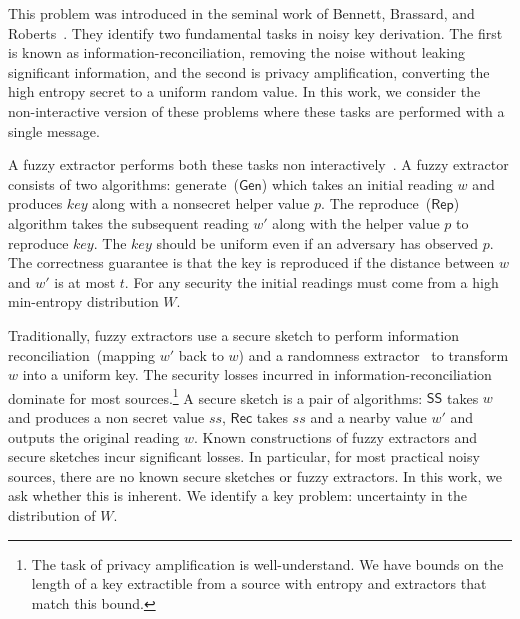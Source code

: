 \documentclass[11pt]{article}
\newcommand{\class}[1]{{\ensuremath{\mathsf{#1}}}}
\newcommand{\gen}{\ensuremath{\class{Gen}}\xspace}
\newcommand{\rep}{\ensuremath{\class{Rep}}\xspace}
\newcommand{\sketch}{\ensuremath{\class{SS}}\xspace}
\newcommand{\rec}{\ensuremath{\class{Rec}}\xspace}
\begin{document}
This problem was introduced in the seminal work of Bennett, Brassard, and Roberts~\cite{bennett1988privacy}.  They identify two fundamental tasks in noisy key derivation.  The first is known as information-reconciliation, removing the noise without leaking significant information, and the second is privacy amplification, converting the high entropy secret to a uniform random value.  In this work, we consider the non-interactive version of these problems where these tasks are performed with a single message.

A fuzzy extractor performs both these tasks non interactively~\cite{DBLP:journals/siamcomp/DodisORS08}.  %
A fuzzy extractor consists of two algorithms: generate~($\gen$) which takes an initial reading $w$ and produces $key$ along with a nonsecret helper value $p$.  The reproduce~($\rep$) algorithm takes the subsequent reading $w'$ along with the helper value $p$ to reproduce $key$.  The $key$ should be uniform even if an adversary has observed $p$.  The correctness guarantee is that the key is reproduced if the distance between $w$ and $w'$ is at most $t$.  For any security the initial readings must come from a high min-entropy distribution $W$.

Traditionally, fuzzy extractors use a secure sketch to perform information reconciliation~(mapping $w'$ back to $w$) and a randomness extractor~\cite{nisan1993randomness} to transform $w$ into a uniform key.  The security losses incurred in information-reconciliation dominate for most sources.\footnote{The task of privacy amplification is well-understand.  We have bounds on the length of a key extractible from a source with entropy and extractors that match this bound.}  A secure sketch is a pair of algorithms: $\sketch$ takes $w$ and produces a non secret value $ss$, $\rec$ takes $ss$ and a nearby value $w'$ and outputs the original reading $w$.  
Known constructions of fuzzy extractors and secure sketches incur significant losses.  In particular, for most practical noisy sources, there are no known secure sketches or fuzzy extractors.  In this work, we ask whether this is inherent.  We identify a key problem: uncertainty in the distribution of $W$.
\end{document}
